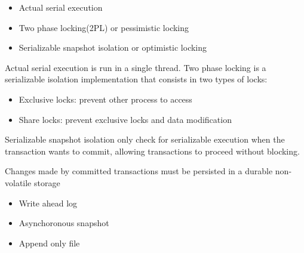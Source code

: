 \documentclass[../../main.tex]{subfiles}
\begin{document}
\begin{itemize}
    \item Actual serial execution
    \item Two phase locking(2PL) or pessimistic locking
    \item Serializable snapshot isolation or optimistic locking
\end{itemize}
Actual serial execution is run in a single thread. Two phase locking is a serializable
isolation implementation that consists in two types of locks:
\begin{itemize}
    \item Exclusive locks: prevent other process to access
    \item Share locks: prevent exclusive locks and data modification
\end{itemize}
Serializable snapshot isolation only check for serializable execution when the
transaction wants to commit, allowing transactions to proceed without blocking.


\begin{definition}[Durability]
    Changes made by committed transactions must be persisted in a durable non-volatile storage
    \begin{itemize}
        \item Write ahead log
        \item Asynchoronous snapshot
        \item Append only file
    \end{itemize}
\end{definition}
\end{document}
